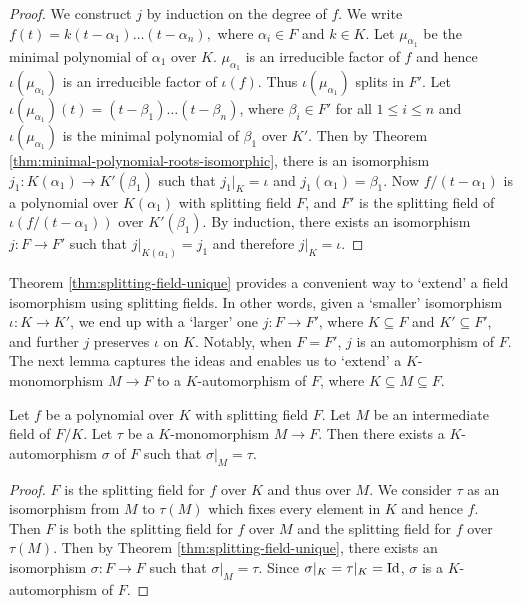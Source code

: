 \begin{proof}
	We construct $j$ by induction on the degree of $f$. We write $ f(t) = k (t - \alpha_1) \ldots (t - \alpha_n), $ where $\alpha_i \in F$ and $k \in K$. Let $\mu_{\alpha_1}$ be the minimal polynomial of $\alpha_1$ over $K$. $\mu_{\alpha_1}$ is an irreducible factor of $f$ and hence $\iota(\mu_{\alpha_1})$ is an irreducible factor of $\iota(f)$. Thus $\iota(\mu_{\alpha_1})$ splits in $F'$. Let $\iota(\mu_{\alpha_1})(t) = (t - \beta_1) \ldots (t - \beta_n)$, where $\beta_i \in F'$ for all $1 \leq i \leq n$ and $\iota(\mu_{\alpha_1})$ is the minimal polynomial of $\beta_1$ over $K'$. Then by Theorem \ref{thm:minimal-polynomial-roots-isomorphic}, there is an isomorphism $j_1 : K(\alpha_1) \to K'(\beta_1)$ such that $j_1 | _K = \iota$ and $j_1(\alpha_1) = \beta_1$. Now $f / (t - \alpha_1)$ is a polynomial over $K(\alpha_1)$ with splitting field $F$, and $F'$ is the splitting field of $\iota(f / (t - \alpha_1))$ over $K'(\beta_1)$. By induction, there exists an isomorphism $j: F \to F'$ such that $j | _{K(\alpha_1)} = j_1$ and therefore $j | _K = \iota$. 
\end{proof}



Theorem \ref{thm:splitting-field-unique} provides a convenient way to `extend' a field isomorphism using splitting fields. In other words, given a `smaller' isomorphism $\iota: K \to K'$, we end up with a `larger' one $j: F \to F'$, where $K \subseteq F$ and $K' \subseteq F'$, and further $j$ preserves $\iota$ on $K$. Notably, when $F  = F'$, $j$ is an automorphism of $F$. The next lemma captures the ideas and enables us to `extend' a $K$-monomorphism $M \to F$ to a $K$-automorphism of $F$, where $K \subseteq M \subseteq F$. 

\begin{lemma} \label{thm:monomorphism-extend-automorphism}
	Let $f$ be a polynomial over $K$ with splitting field $F$. Let $M$ be an intermediate field of $F/K$. Let $\tau$ be a $K$-monomorphism $M \to F$. Then there exists a $K$-automorphism $\sigma$ of $F$ such that $\sigma | _M = \tau$.  
\end{lemma}

\begin{proof}
	$F$ is the splitting field for $f$ over $K$ and thus over $M$. We consider $\tau$ as an isomorphism from $M$ to $\tau(M)$ which fixes every element in $K$ and hence $f$. Then $F$ is both the splitting field for $f$ over $M$ and the splitting field for $f$ over $\tau(M)$. Then by Theorem \ref{thm:splitting-field-unique}, there exists an isomorphism $\sigma: F \to F$ such that $\sigma | _M = \tau$. Since $\sigma | _K = \tau |_K = \operatorname{Id}$, $\sigma$ is a $K$-automorphism of $F$. 
\end{proof}

